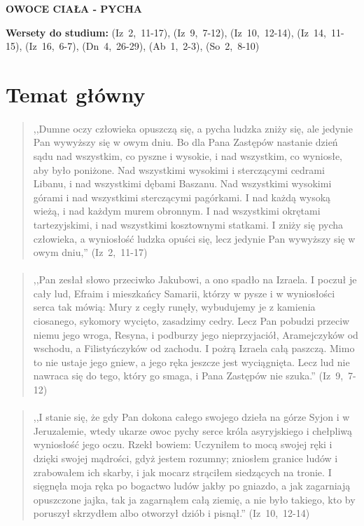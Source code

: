 \documentclass[10pt,a4paper,oneside]{article}
\begin{document}
\centerline{\textbf{\MakeUppercase{Owoce ciała - pycha}}}
\begin{center}
\textbf{Wersety do studium:} \mbox{(Iz 2, 11-17)}, \mbox{(Iz 9, 7-12)}, \mbox{(Iz 10, 12-14)}, \mbox{(Iz 14, 11-15)}, \mbox{(Iz 16, 6-7)}, \mbox{(Dn 4, 26-29)}, \mbox{(Ab 1, 2-3)}, \mbox{(So 2, 8-10)}
\end{center}
\section{Temat główny}
\paragraph{}
\begin{quote}
,,Dumne oczy człowieka opuszczą się, a pycha ludzka zniży się, ale jedynie Pan wywyższy się w owym dniu. Bo dla Pana Zastępów nastanie dzień sądu nad wszystkim, co pyszne i wysokie, i nad wszystkim, co wyniosłe, aby było poniżone. Nad wszystkimi wysokimi i sterczącymi cedrami Libanu, i nad wszystkimi dębami Baszanu. Nad wszystkimi wysokimi górami i nad wszystkimi sterczącymi pagórkami. I nad każdą wysoką wieżą, i nad każdym murem obronnym. I nad wszystkimi okrętami tartezyjskimi, i nad wszystkimi kosztownymi statkami. I zniży się pycha człowieka, a wyniosłość ludzka opuści się, lecz jedynie Pan wywyższy się w owym dniu,'' \mbox{(Iz 2, 11-17)}
\end{quote}
\paragraph{}
\begin{quote}
,,Pan zesłał słowo przeciwko Jakubowi, a ono spadło na Izraela. I poczuł je cały lud, Efraim i mieszkańcy Samarii, którzy w pysze i w wyniosłości serca tak mówią: Mury z cegły runęły, wybudujemy je z kamienia ciosanego, sykomory wycięto, zasadzimy cedry. Lecz Pan pobudzi przeciw niemu jego wroga, Resyna, i podburzy jego nieprzyjaciół, Aramejczyków od wschodu, a Filistyńczyków od zachodu. I pożrą Izraela całą paszczą. Mimo to nie ustaje jego gniew, a jego ręka jeszcze jest wyciągnięta. Lecz lud nie nawraca się do tego, który go smaga, i Pana Zastępów nie szuka.'' \mbox{(Iz 9, 7-12)}
\end{quote}
\paragraph{}
\begin{quote}
,,I stanie się, że gdy Pan dokona całego swojego dzieła na górze Syjon i w Jeruzalemie, wtedy ukarze owoc pychy serce króla asyryjskiego i chełpliwą wyniosłość jego oczu. Rzekł bowiem: Uczyniłem to mocą swojej ręki i dzięki swojej mądrości, gdyż jestem rozumny; zniosłem granice ludów i zrabowałem ich skarby, i jak mocarz strąciłem siedzących na tronie. I sięgnęła moja ręka po bogactwo ludów jakby po gniazdo, a jak zagarniają opuszczone jajka, tak ja zagarnąłem całą ziemię, a nie było takiego, kto by poruszył skrzydłem albo otworzył dziób i pisnął.'' \mbox{(Iz 10, 12-14)}
\end{quote}
\end{document}

